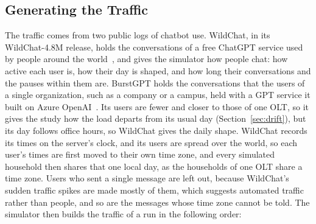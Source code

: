 \documentclass[cic,dipl,english]{infufrgs}
\begin{document}
\subsection{Generating the Traffic}
\label{sec:traffic}

The traffic comes from two public logs of chatbot use. WildChat, in its WildChat-4.8M release,
holds the conversations of a free ChatGPT service used by people around the
world~\cite{zhao2024wildchat}, and gives the simulator how people chat: how active each user is,
how their day is shaped, and how long their conversations and the pauses within them are.
BurstGPT holds the conversations that the users of a single organization, such as a company or a
campus, held with a GPT service it built on Azure OpenAI~\cite{wang2025burstgpt}. Its users are
fewer and closer to those of one OLT, so it gives the study how the load departs from its usual
day (Section~\ref{sec:drift}), but its day follows office hours, so WildChat gives the daily
shape. WildChat records its times on the server's
clock, and its users are spread over the world, so each user's times are first moved to their
own time zone, and every simulated household then shares that one local day, as the households of
one OLT share a time zone. Users who sent a single message are left out, because WildChat's sudden
traffic spikes are made mostly of them, which suggests automated traffic rather than people, and
so are the messages whose time zone cannot be told. The simulator then builds the traffic of a run
in the following order:
\end{document}
